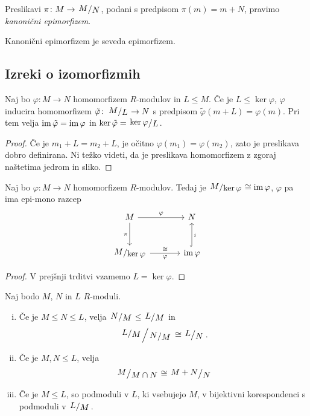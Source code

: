 \begin{definicija}
Preslikavi $\pi \colon M \to \kvoc{M}{N}$, podani s predpisom
$\pi(m) = m + N$, pravimo
\emph{kanonični epimorfizem}.
\end{definicija}

\begin{opomba}
Kanonični epimorfizem je seveda epimorfizem.
\end{opomba}

\newpage

\subsection{Izreki o izomorfizmih}

\begin{trditev}
Naj bo $\varphi \colon M \to N$ homomorfizem $R$-modulov in
$L \leq M$. Če je $L \leq \ker \varphi$, $\varphi$ inducira
homomorfizem $\tilde{\varphi} \colon \kvoc{M}{L} \to N$ s predpisom
$\tilde{\varphi}(m + L) = \varphi(m)$. Pri tem velja
$\operatorname{im} \tilde{\varphi} = \operatorname{im} \varphi$ in
$\ker \tilde{\varphi} = \kvoc{\ker \varphi}{L}$.
\end{trditev}

\begin{proof}
Če je $m_1 + L = m_2 + L$, je očitno $\varphi(m_1) = \varphi(m_2)$,
zato je preslikava dobro definirana. Ni težko videti, da je
preslikava homomorfizem z zgoraj naštetima jedrom in sliko.
\end{proof}

\begin{izrek}[O izomorfizmu]
Naj bo $\varphi \colon M \to N$ homomorfizem $R$-modulov. Tedaj je
$\kvoc{M}{\ker \varphi} \cong \im \varphi$, $\varphi$ pa ima
epi-mono razcep
\[
\begin{tikzcd}[column sep=large, row sep=large]
M \arrow[r, "\varphi"] \arrow[d, "\pi"'] &
N \\
\kvoc{M}{\ker \varphi} \arrow[r, "\cong", "\varphi"'] &
\im \varphi \arrow[u, hook, "i"']
\end{tikzcd}
\]
\end{izrek}

\begin{proof}
V prejšnji trditvi vzamemo $L = \ker \varphi$.
\end{proof}

\begin{izrek}[Noether]
Naj bodo $M$, $N$ in $L$ $R$-moduli.

\begin{enumerate}[i)]
\item Če je $M \leq N \leq L$, velja
$\kvoc{N}{M} \leq \kvoc{L}{M}$ in
\[
\kvoc{\kvoc{L}{M}}{\kvoc{N}{M}} \cong \kvoc{L}{N}.
\]
\item Če je $M, N \leq L$, velja
\[
\kvoc{M}{M \cap N} \cong \kvoc{M+N}{N}
\]
\item Če je $M \leq L$, so podmoduli v $L$, ki vsebujejo $M$, v
bijektivni korespondenci s podmoduli v $\kvoc{L}{M}$.
\end{enumerate}
\end{izrek}

